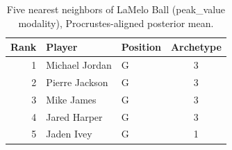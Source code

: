\begin{table}[htbp]
  \centering\small
  \begin{tabular}{rllc}
    \toprule
    Rank & Player & Position & Archetype \\
    \midrule
    1 & Michael Jordan & G & 3 \\
    2 & Pierre Jackson & G & 3 \\
    3 & Mike James & G & 3 \\
    4 & Jared Harper & G & 3 \\
    5 & Jaden Ivey & G & 1 \\
    \bottomrule
  \end{tabular}
  \caption{Five nearest neighbors of LaMelo Ball (peak_value modality), Procrustes-aligned posterior mean.}
  \label{tab:LaMelo_Ball_neighbors_peak_value}
\end{table}

